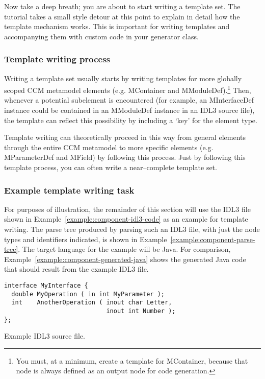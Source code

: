 Now take a deep breath; you are about to start writing a template set. The
tutorial takes a small style detour at this point to explain in detail how the
template mechanism works. This is important for writing templates and
accompanying them with custom code in your generator class.

\subsubsection{Template writing process}

Writing a template set usually starts by writing templates for more globally
scoped CCM metamodel elements (e.g. MContainer and MModuleDef).\footnote{You
must, at a minimum, create a template for MContainer, because that node is
always defined as an output node for code generation.} Then, whenever a
potential subelement is encountered (for example, an MInterfaceDef instance
could be contained in an MModuleDef instance in an IDL3 source file), the
template can reflect this possibility by including a `key' for the element type.

Template writing can theoretically proceed in this way from general elements
through the entire CCM metamodel to more specific elements (e.g. MParameterDef
and MField) by following this process. Just by following this template process,
you can often write a near--complete template set.

\subsubsection{Example template writing task}

For purposes of illustration, the remainder of this section will use the IDL3
file shown in Example~\ref{example:component-idl3-code} as an example for
template writing. The parse tree produced by parsing such an IDL3 file, with
just the node types and identifiers indicated, is shown in
Example~\ref{example:component-parse-tree}. The target language for the example
will be Java. For comparison, Example~\ref{example:component-generated-java}
shows the generated Java code that should result from the example IDL3 file.

\begin{Example}
\begin{minifbox}
\begin{small}
\begin{verbatim}
interface MyInterface {
  double MyOperation ( in int MyParameter );
  int    AnotherOperation ( inout char Letter,
                            inout int Number );
};
\end{verbatim}
\end{small}
\end{minifbox}
\caption{Example IDL3 source file.}
\label{example:component-idl3-code}
\end{Example}

